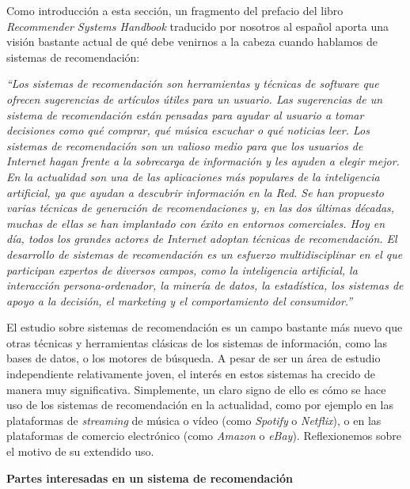 Como introducción a esta sección, un fragmento del prefacio del libro \textit{Recommender Systems Handbook} \cite{recommender_handbook}
traducido por nosotros al español aporta una visión bastante actual de qué debe venirnos a la cabeza cuando hablamos de sistemas de recomendación:

\textit{``Los sistemas de recomendación son herramientas y técnicas de software que ofrecen sugerencias de artículos 
útiles para un usuario. Las sugerencias de un sistema de recomendación están pensadas para ayudar al usuario a tomar 
decisiones como qué comprar, qué música escuchar o qué noticias leer. Los sistemas de recomendación son un valioso medio
 para que los usuarios de Internet hagan frente a la sobrecarga de información y les ayuden a elegir mejor. En la 
 actualidad son una de las aplicaciones más populares de la inteligencia artificial, ya que ayudan a descubrir información
 en la Red. Se han propuesto varias técnicas de generación de recomendaciones y, en las dos últimas décadas, muchas de
 ellas se han implantado con éxito en entornos comerciales. Hoy en día, todos los grandes actores de Internet adoptan técnicas de
 recomendación. El desarrollo de sistemas de recomendación es un esfuerzo multidisciplinar en el que participan expertos 
 de diversos campos, como la inteligencia artificial, la interacción persona-ordenador, la minería de datos, la estadística, 
 los sistemas de apoyo a la decisión, el marketing y el comportamiento del consumidor.''}

El estudio sobre sistemas de recomendación es un campo bastante más nuevo que otras técnicas y herramientas clásicas de los sistemas de información, 
como las bases de datos, o los motores de búsqueda. A pesar de ser un área de estudio independiente relativamente joven, el interés en estos sistemas
ha crecido de manera muy significativa. Simplemente, un claro signo de ello es cómo se hace uso de los sistemas de recomendación en la actualidad,
como por ejemplo en las plataformas de \textit{streaming} de música o vídeo (como \textit{Spotify} o \textit{Netflix}), o en las plataformas de
comercio electrónico (como \textit{Amazon} o \textit{eBay}). Reflexionemos sobre el motivo de su extendido uso. 

\textbf{Partes interesadas en un sistema de recomendación}

